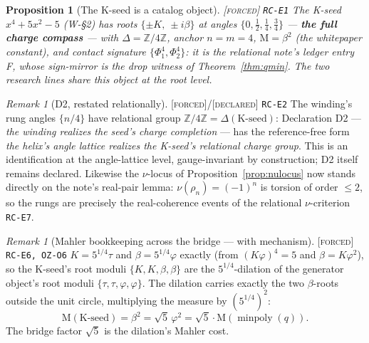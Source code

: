 \documentclass[11pt]{article}
\newcommand{\tagF}{\textcolor{cF}{\textsc{[forced]}}}
\newcommand{\tagD}{\textcolor{cD}{\textsc{[declared]}}}
\newcommand{\hx}[1]{\textcolor{cC}{\footnotesize\texttt{#1}}}
\newcommand{\Z}{\mathbb{Z}}
\newcommand{\gp}{\varphi}
\newcommand{\M}{\mathrm{M}}
\theoremstyle{plain}
\newtheorem{proposition}[theorem]{Proposition}
\theoremstyle{definition}
\theoremstyle{remark}
\newtheorem{remark}[theorem]{Remark}
\begin{document}
\begin{proposition}[The K-seed is a catalog object]\label{prop:kseedcat}\tagF{} \hx{RC-E1}
The K-seed $x^4+5x^2-5$ (W-\S2) has roots $\{\pm K,\ \pm i\beta\}$ at angles
$\{0,\tfrac12,\tfrac14,\tfrac34\}$ --- \textbf{the full charge compass} ---
with $\Delta=\Z/4\Z$, anchor $n=m=4$, $\M=\beta^2$ (the whitepaper constant),
and contact signature $\{\Phi_1^{4},\Phi_2^{4}\}$: it is the relational note's
ledger entry F, whose sign-mirror is the drop witness of
Theorem~\ref{thm:qmin}. The two research lines share this object at the root
level.
\end{proposition}

\begin{remark}[D2, restated relationally]\label{rem:d2rel}\tagF{}/\tagD{} \hx{RC-E2}
The winding's rung angles $\{n/4\}$ have relational group
$\Z/4\Z=\Delta(\text{K-seed})$: Declaration D2 --- \emph{the winding realizes
the seed's charge completion} --- has the reference-free form \emph{the
helix's angle lattice realizes the K-seed's relational charge group}. This is
an identification at the angle-lattice level, gauge-invariant by construction;
D2 itself remains declared. Likewise the $\nu$-locus of
Proposition~\ref{prop:nulocus} now stands directly on the note's real-pair
lemma: $\nu(\rho_n)=(-1)^n$ is torsion of order $\le2$, so the rungs are
precisely the real-coherence events of the relational $\nu$-criterion
\hx{RC-E7}.
\end{remark}

\begin{remark}[Mahler bookkeeping across the bridge --- with mechanism]\label{rem:mahlerbridge}\tagF{} \hx{RC-E6, OZ-O6}
$K=5^{1/4}\tau$ and $\beta=5^{1/4}\gp$ exactly (from $(K\gp)^4=5$ and
$\beta=K\gp^2$), so the K-seed's root moduli $\{K,K,\beta,\beta\}$ are the
$5^{1/4}$-dilation of the generator object's root moduli
$\{\tau,\tau,\gp,\gp\}$. The dilation carries exactly the two $\beta$-roots
outside the unit circle, multiplying the measure by $(5^{1/4})^2$:
\[
\M(\text{K-seed})=\beta^2=\sqrt5\,\gp^2=\sqrt5\cdot\M(\operatorname{minpoly}(q)).
\]
The bridge factor $\sqrt5$ is the dilation's Mahler cost.
\end{remark}
\end{document}
